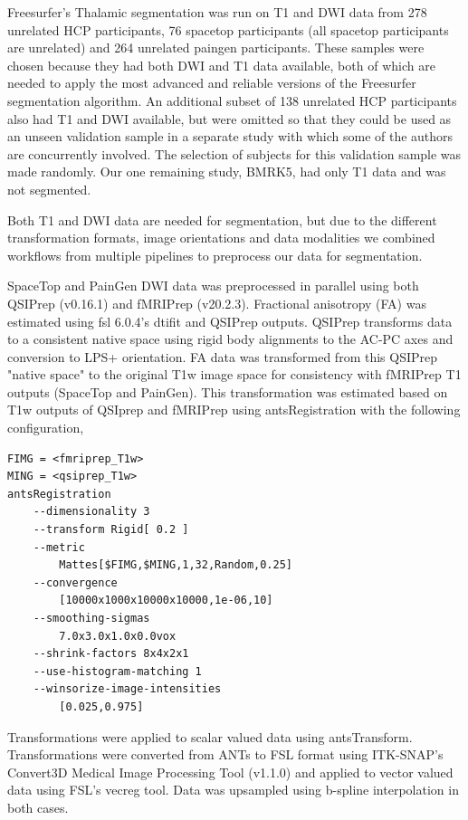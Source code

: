 \documentclass[10pt,letterpaper]{article}
\begin{document}
Freesurfer's Thalamic segmentation was run on T1 and DWI data from 278 unrelated HCP participants, 76 spacetop participants (all spacetop participants are unrelated) and 264 unrelated paingen participants. These samples were chosen because they had both DWI and T1 data available, both of which are needed to apply the most advanced and reliable versions of the Freesurfer segmentation algorithm. An additional subset of 138 unrelated HCP participants also had T1 and DWI available, but were omitted so that they could be used as an unseen validation sample in a separate study with which some of the authors are concurrently involved. The selection of subjects for this validation sample was made randomly. Our one remaining study, BMRK5, had only T1 data and was not segmented. 

Both T1 and DWI data are needed for segmentation, but due to the different transformation formats, image orientations and data modalities we combined workflows from multiple pipelines to preprocess our data for segmentation.

SpaceTop and PainGen DWI data was preprocessed in parallel using both QSIPrep (v0.16.1) and fMRIPrep (v20.2.3). Fractional anisotropy (FA) was estimated using fsl 6.0.4's dtifit and QSIPrep outputs. QSIPrep transforms data to a consistent native space using rigid body alignments to the AC-PC axes and conversion to LPS+ orientation. FA data was transformed from this QSIPrep "native space" to the original T1w image space for consistency with fMRIPrep T1 outputs (SpaceTop and PainGen). This transformation was estimated based on T1w outputs of QSIprep and fMRIPrep using antsRegistration with the following configuration,

\begin{lstlisting}
FIMG = <fmriprep_T1w>
MING = <qsiprep_T1w>
antsRegistration
    --dimensionality 3
    --transform Rigid[ 0.2 ]
    --metric 
        Mattes[$FIMG,$MING,1,32,Random,0.25]
    --convergence 
        [10000x1000x10000x10000,1e-06,10] 
    --smoothing-sigmas 
        7.0x3.0x1.0x0.0vox 
    --shrink-factors 8x4x2x1
    --use-histogram-matching 1 
    --winsorize-image-intensities 
        [0.025,0.975]
\end{lstlisting}

Transformations were applied to scalar valued data using antsTransform. Transformations were converted from ANTs to FSL format using ITK-SNAP's Convert3D Medical Image Processing Tool (v1.1.0) and applied to vector valued data using FSL's vecreg tool. Data was upsampled using b-spline interpolation in both cases.
\end{document}
